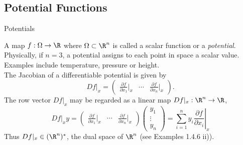 \documentclass[smaller,hyperref={CJKbookmarks=true}]{beamer}
\begin{document}
\subsection{Potential Functions}
\begin{frame}[c]
\begin{spacing}{2.5}
\tableofcontents[sectionstyle=hide,subsectionstyle=show/shaded/hide]
\end{spacing}
\end{frame}
\begin{frame}[t]{Potentials}
\begin{spacing}{1.05}
A map $f:\Omega\to\R$ where $\Omega\subset\R^n$ is called a scalar function or a \emph{potential}. Physically, if $n=3$, a potential assigns to each point in space a scalar value. Examples include temperature, pressure or height.\\[5pt]
The Jacobian of a dif{}ferentiable potential is given by
\[Df|_x=\begin{pmatrix}
          \frac{\partial f}{\partial x_1}\big|_x & \cdots & \frac{\partial f}{\partial x_n}\big|_x
        \end{pmatrix}.\]
The row vector $Df|_x$ may be regarded as a linear map $Df|_x:\R^n\to\R$,
\[Df|_xy=\begin{pmatrix}
          \frac{\partial f}{\partial x_1}\big|_x & \cdots & \frac{\partial f}{\partial x_n}\big|_x
        \end{pmatrix}\begin{pmatrix}
                       y_1 \\
                       \vdots \\
                       y_n
                     \end{pmatrix}=\left.\sum_{i=1}^{n}y_i\frac{\partial f}{\partial x_i}\right|_x\]
Thus $Df|_x\in(\R^n)^*$, the dual space of $\R^n$ (see Examples 1.4.6 ii)).
\end{spacing}
\end{frame}
\end{document}
